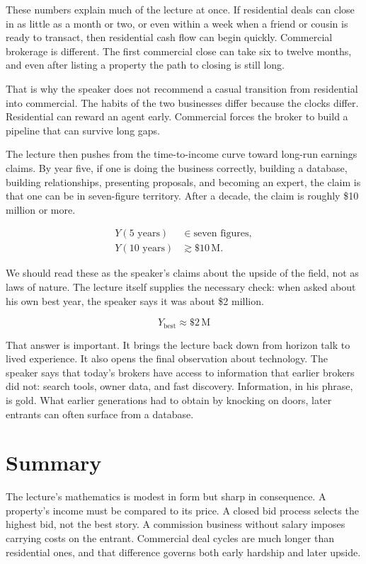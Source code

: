 These numbers explain much of the lecture at once. If residential deals can close in as little as a month or two, or even within a week when a friend or cousin is ready to transact, then residential cash flow can begin quickly. Commercial brokerage is different. The first commercial close can take six to twelve months, and even after listing a property the path to closing is still long.

That is why the speaker does not recommend a casual transition from residential into commercial. The habits of the two businesses differ because the clocks differ. Residential can reward an agent early. Commercial forces the broker to build a pipeline that can survive long gaps.

The lecture then pushes from the time-to-income curve toward long-run earnings claims. By year five, if one is doing the business correctly, building a database, building relationships, presenting proposals, and becoming an expert, the claim is that one can be in seven-figure territory. After a decade, the claim is roughly \$10 million or more.

\begin{align}
Y(5\text{ years}) &\in \text{seven figures}, \\
Y(10\text{ years}) &\gtrsim \$10\,\text{M}.
\end{align}

We should read these as the speaker's claims about the upside of the field, not as laws of nature. The lecture itself supplies the necessary check: when asked about his own best year, the speaker says it was about \$2 million.

\begin{equation}
Y_{\text{best}} \approx \$2\,\text{M}
\end{equation}

That answer is important. It brings the lecture back down from horizon talk to lived experience. It also opens the final observation about technology. The speaker says that today's brokers have access to information that earlier brokers did not: search tools, owner data, and fast discovery. Information, in his phrase, is gold. What earlier generations had to obtain by knocking on doors, later entrants can often surface from a database.

\section{Summary}

The lecture's mathematics is modest in form but sharp in consequence. A property's income must be compared to its price. A closed bid process selects the highest bid, not the best story. A commission business without salary imposes carrying costs on the entrant. Commercial deal cycles are much longer than residential ones, and that difference governs both early hardship and later upside.

